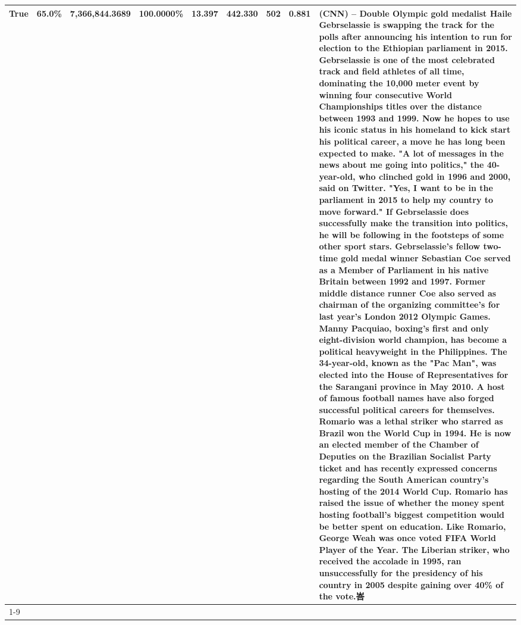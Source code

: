 \begin{table}[H]
{\begin{tabular}{lllrlllll}
True & 65.0\% & 7,366,844.3689 & \bfseries \color{red} 100.0000\% & 13.397 & 442.330 & 502 & 0.881 & (CNN) -- Double Olympic gold medalist Haile Gebrselassie is swapping the track for the polls after announcing his intention to run for election to the Ethiopian parliament in 2015. Gebrselassie is one of the most celebrated track and field athletes of all time, dominating the 10,000 meter event by winning four consecutive World Championships titles over the distance between 1993 and 1999. Now he hopes to use his iconic status in his homeland to kick start his political career, a move he has long been expected to make. "A lot of messages in the news about me going into politics," the 40-year-old, who clinched gold in 1996 and 2000, said on Twitter. "Yes, I want to be in the parliament in 2015 to help my country to move forward." If Gebrselassie does successfully make the transition into politics, he will be following in the footsteps of some other sport stars. Gebrselassie's fellow two-time gold medal winner Sebastian Coe served as a Member of Parliament in his native Britain between 1992 and 1997. Former middle distance runner Coe also served as chairman of the organizing committee's for last year's London 2012 Olympic Games. Manny Pacquiao, boxing's first and only eight-division world champion, has become a political heavyweight in the Philippines. The 34-year-old, known as the "Pac Man", was elected into the House of Representatives for the Sarangani province in May 2010. A host of famous football names have also forged successful political careers for themselves. Romario was a lethal striker who starred as Brazil won the World Cup in 1994. He is now an elected member of the Chamber of Deputies on the Brazilian Socialist Party ticket and has recently expressed concerns regarding the South American country's hosting of the 2014 World Cup. Romario has raised the issue of whether the money spent hosting football's biggest competition would be better spent on education. Like Romario, George Weah was once voted FIFA World Player of the Year. The Liberian striker, who received the accolade in 1995, ran unsuccessfully for the presidency of his country in 2005 despite gaining over 40\% of the vote.峇 \\
\cline{1-9}

\end{tabular}}
\end{table}
